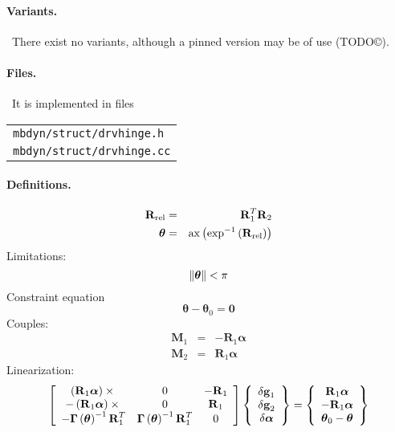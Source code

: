 \documentclass[10pt,dvips,fleqn,subeqn]{report}
\newcommand{\T}[1]{\bm{\mathbf{#1}}}
\begin{document}
\paragraph{Variants.} \
There exist no variants, although a pinned version may be of use (TODO\copyright).

\paragraph{Files.} \
It is implemented in files

\begin{tabular}{l}
\texttt{mbdyn/struct/drvhinge.h} \\
\texttt{mbdyn/struct/drvhinge.cc}
\end{tabular}

\paragraph{Definitions.}
\begin{eqnarray*}
	\T{R}_{\text{rel}} & = & \T{R}_1^T \T{R}_2 \\
	\T{\theta} & = & \llk{ax}\plbr{\llk{exp}^{-1}\plbr{\T{R}_{\text{rel}}}}
\end{eqnarray*}
Limitations:
\begin{equation}
	\nrbr{\T{\theta}} < \pi
\end{equation}
Constraint equation 
\begin{equation}
	\T{\theta} - \T{\theta}_0 = \T{0}
\end{equation}
Couples:
\begin{eqnarray*}
	\T{M}_1 & = & -\T{R}_1 \T{\alpha} \\
	\T{M}_2 & = & \T{R}_1 \T{\alpha}
\end{eqnarray*}
Linearization:
\begin{equation}
	\sqbr{\matr{ccc}{
		\plbr{\T{R}_1 \T{\alpha}}\times{} & 0 & -\T{R}_1 \\
		-\plbr{\T{R}_1 \T{\alpha}}\times{} & 0 & \T{R}_1 \\
		-\T{\Gamma}\plbr{\T{\theta}}^{-1} \T{R}_1^T &
			\T{\Gamma}\plbr{\T{\theta}}^{-1} \T{R}_1^T & 0
	}}\cubr{\cvvect{
		\delta\T{g}_1 \\
		\delta\T{g}_2 \\
		\delta\T{\alpha} \\
	}} = \cubr{\cvvect{
		\T{R}_1 \T{\alpha} \\
		-\T{R}_1 \T{\alpha} \\
		\T{\theta}_0 - \T{\theta}
	}}
\end{equation}
\end{document}
